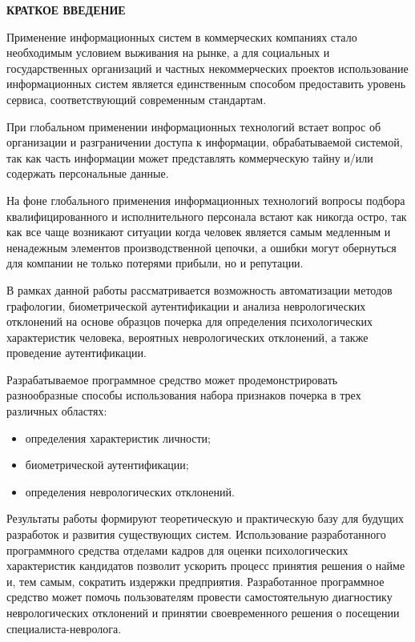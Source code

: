\begin{center}
{\bfseries КРАТКОЕ ВВЕДЕНИЕ}
\end{center}
\label{sec:intro}

Применение информационных систем в коммерческих компаниях стало необходимым условием выживания на рынке, а для социальных и государственных организаций и частных некоммерческих проектов использование информационных систем является единственным способом предоставить уровень сервиса, соответствующий современным стандартам. 

При глобальном применении информационных технологий встает вопрос об организации и разграничении доступа к информации, обрабатываемой системой, так как часть информации может представлять коммерческую тайну и/или содержать персональные данные.

На фоне глобального применения информационных технологий вопросы подбора квалифицированного и исполнительного персонала встают как никогда остро, так как все чаще возникают ситуации когда человек является самым медленным и ненадежным элементов производственной цепочки, а ошибки могут обернуться для компании не только потерями прибыли, но и репутации.

В рамках данной работы рассматривается возможность автоматизации методов графологии, биометрической аутентификации и анализа неврологических отклонений на основе образцов почерка для определения психологических характеристик человека, вероятных неврологических отклонений, а также проведение аутентификации.

Разрабатываемое программное средство может продемонстрировать разнообразные способы использования набора признаков почерка в трех различных областях:
\begin{itemize}
	\item определения характеристик личности;
	\item биометрической аутентификации;
	\item определения неврологических отклонений.
\end{itemize}

Результаты работы формируют теоретическую и практическую базу для будущих разработок и развития существующих систем.
Использование разработанного программного средства отделами кадров для оценки психологических характеристик кандидатов позволит ускорить процесс принятия решения о найме и, тем самым, сократить издержки предприятия. Разработанное программное средство может помочь пользователям провести самостоятельную диагностику неврологических отклонений и принятии своевременного решения о посещении специалиста-невролога.
\clearpage